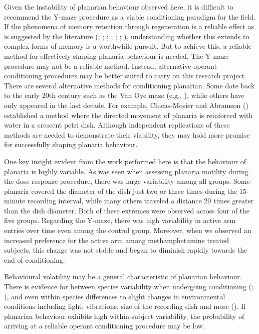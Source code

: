 \documentclass[
  jou,
  floatsintext,
  longtable,
  nolmodern,
  notxfonts,
  notimes,
  donotrepeattitle,
  colorlinks=true,linkcolor=blue,citecolor=blue,urlcolor=blue]{apa7}
\begin{document}
Given the instability of planarian behaviour observed here, it is
difficult to recommend the Y-maze procedure as a viable conditioning
paradigm for the field. If the phenomena of memory retention through
regeneration is a reliable effect as is suggested by the literature
(;
;
;
;
;
;
),
understanding whether this extends to complex forms of memory is a
worthwhile pursuit. But to achieve this, a reliable method for
effectively shaping planaria behaviour is needed. The Y-maze procedure
may not be a reliable method. Instead, alternative operant conditioning
procedures may be better suited to carry on this research project. There
are several alternative methods for conditioning planarian. Some date
back to the early 20th century such as the Van Oye maze (e.g.,
), while others have only
appeared in the last decade. For example, Chicas-Mosier and Abramson
() established a method where
the directed movement of planaria is reinforced with water in a crescent
petri dish. Although independent replications of these methods are
needed to demonstrate their viability, they may hold more promise for
successfully shaping planaria behaviour.

One key insight evident from the work performed here is that the
behaviour of planaria is highly variable. As was seen when assessing
planaria motility during the dose response procedure, there was large
variability among all groups. Some planaria covered the diameter of the
dish just two or three times during the 15-minute recording interval,
while many others traveled a distance 20 times greater than the dish
diameter. Both of these extremes were observed across four of the five
groups. Regarding the Y-maze, there was high variability in active arm
entries over time even among the control group. Moreover, when we
observed an increased preference for the active arm among
methamphetamine treated subjects, this change was not stable and began
to diminish rapidly towards the end of conditioning.

Behavioural volatility may be a general characteristic of planarian
behaviour. There is evidence for between species variability when
undergoing conditioning (; ), and even within species differences to slight changes in
environmental conditions including light, vibrations, size of the
recording dish and more (). If planarian behaviour exhibits high within-subject
variability, the probability of arriving at a reliable operant
conditioning procedure may be low.
\end{document}

